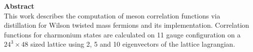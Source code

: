 {\huge \centering \textbf{Abstract}}\\

This work describes the computation of meson correlation functions via distillation for Wilson twisted mass fermions and its implementation. Correlation functions for charmonium states are calculated on 11 gauge configuration on a $24^3 \times 48$ sized lattice using 2, 5 and 10 eigenvectors of the lattice lagrangian. 